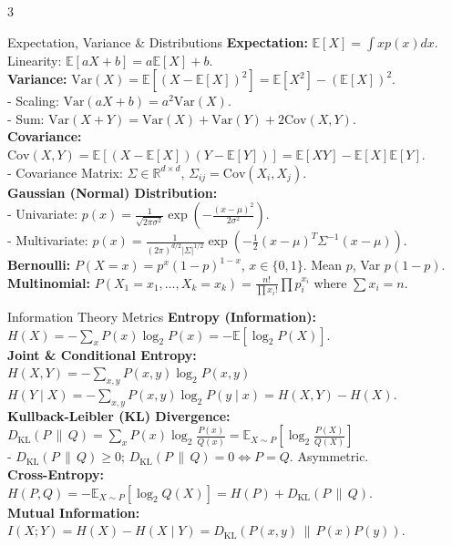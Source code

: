 \documentclass[10pt]{article}
\begin{document}
\begin{multicols*}{3}
\begin{calcBox}{Expectation, Variance \& Distributions}
\textbf{Expectation:} $\mathbb{E}[X] = \int x p(x) dx$. Linearity: $\mathbb{E}[aX + b] = a\mathbb{E}[X] + b$. \\
\textbf{Variance:} $\text{Var}(X) = \mathbb{E}[(X - \mathbb{E}[X])^2] = \mathbb{E}[X^2] - (\mathbb{E}[X])^2$. \\
- Scaling: $\text{Var}(aX + b) = a^2 \text{Var}(X)$. \\
- Sum: $\text{Var}(X+Y) = \text{Var}(X) + \text{Var}(Y) + 2\text{Cov}(X,Y)$. \\
\textbf{Covariance:} $\text{Cov}(X,Y) = \mathbb{E}[(X-\mathbb{E}[X])(Y-\mathbb{E}[Y])] = \mathbb{E}[XY] - \mathbb{E}[X]\mathbb{E}[Y]$. \\
- Covariance Matrix: $\Sigma \in \mathbb{R}^{d \times d}$, $\Sigma_{ij} = \text{Cov}(X_i, X_j)$. \\
\textbf{Gaussian (Normal) Distribution:} \\
- Univariate: $p(x) = \frac{1}{\sqrt{2\pi\sigma^2}} \exp\left( -\frac{(x-\mu)^2}{2\sigma^2} \right)$. \\
- Multivariate: $p(x) = \frac{1}{(2\pi)^{d/2} |\Sigma|^{1/2}} \exp\left( -\frac{1}{2}(x-\mu)^T \Sigma^{-1} (x-\mu) \right)$. \\
\textbf{Bernoulli:} $P(X=x) = p^x (1-p)^{1-x}$, $x \in \{0, 1\}$. Mean $p$, Var $p(1-p)$. \\
\textbf{Multinomial:} $P(X_1=x_1, \dots, X_k=x_k) = \frac{n!}{\prod x_i!} \prod p_i^{x_i}$ where $\sum x_i = n$.
\end{calcBox}

\begin{calcBox}{Information Theory Metrics}
\textbf{Entropy (Information):} \\
$H(X) = -\sum_{x} P(x) \log_2 P(x) = -\mathbb{E}[\log_2 P(X)]$. \\
\textbf{Joint \& Conditional Entropy:} \\
$H(X,Y) = -\sum_{x,y} P(x,y) \log_2 P(x,y)$ \\
$H(Y \mid X) = -\sum_{x,y} P(x,y) \log_2 P(y \mid x) = H(X,Y) - H(X)$. \\
\textbf{Kullback-Leibler (KL) Divergence:} \\
$D_{\text{KL}}(P \,\|\, Q) = \sum_{x} P(x) \log_2 \frac{P(x)}{Q(x)} = \mathbb{E}_{X \sim P}\left[\log_2 \frac{P(X)}{Q(X)}\right]$ \\
- $D_{\text{KL}}(P \,\|\, Q) \ge 0$; $D_{\text{KL}}(P \,\|\, Q) = 0 \iff P = Q$. Asymmetric. \\
\textbf{Cross-Entropy:} \\
$H(P, Q) = -\mathbb{E}_{X \sim P}[\log_2 Q(X)] = H(P) + D_{\text{KL}}(P \,\|\, Q)$. \\
\textbf{Mutual Information:} \\
$I(X; Y) = H(X) - H(X \mid Y) = D_{\text{KL}}(P(x,y) \,\|\, P(x)P(y))$.
\end{calcBox}


\end{multicols*}
\end{document}
